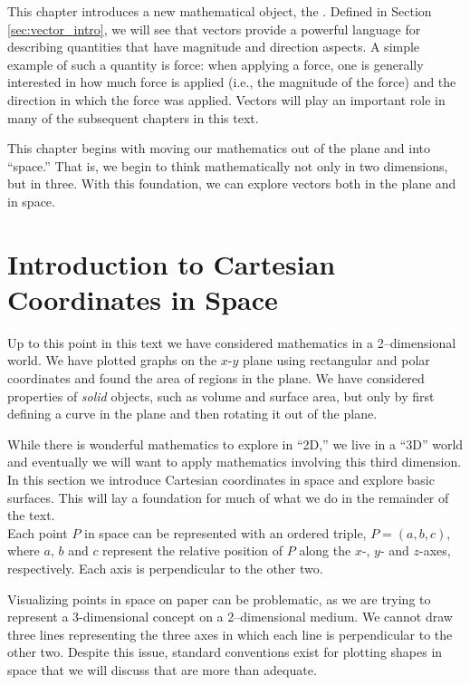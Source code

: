 This chapter introduces a new mathematical object, the . Defined in Section \ref{sec:vector_intro}, we will see that vectors provide a powerful language for describing quantities that have magnitude and direction aspects. A simple example of such a quantity is force: when applying a force, one is generally interested in how much force is applied (i.e., the magnitude of the force) and the direction in which the force was applied. Vectors will play an important role in many of the subsequent chapters in this text. 

This chapter begins with moving our mathematics out of the plane and into ``space.'' That is, we begin to think mathematically not only in two dimensions, but in three. With this foundation, we can explore vectors both in the plane and in space. 

\section{Introduction to Cartesian Coordinates in Space}\label{sec:space_coord}

Up to this point in this text we have considered mathematics in a 2--dimensional world. We have plotted graphs on the $x$-$y$ plane using rectangular and polar coordinates and found the area of regions in the plane. We have considered properties of \textit{solid} objects, such as volume and surface area, but only by first defining a curve in the plane and then rotating it out of the plane.

While there is wonderful mathematics to explore in ``2D,'' we live in a ``3D'' world and eventually we will want to apply mathematics involving this third dimension. In this section we introduce Cartesian coordinates in space and explore basic surfaces. This will lay a foundation for much of what we do in the remainder of the text.\\

Each point $P$ in space can be represented with an ordered triple, $P=(a,b,c)$, where $a$, $b$ and $c$ represent the relative position of $P$ along the $x$-, $y$- and $z$-axes, respectively. Each axis is perpendicular to the other two.

Visualizing points in space on paper can be problematic, as we are trying to represent a 3-dimensional concept on a 2--dimensional medium. We cannot draw three lines representing the three axes in which each line is perpendicular to the other two. Despite this issue, standard conventions exist for plotting shapes in space that we will discuss that are more than adequate.

